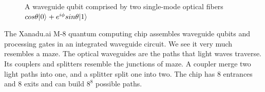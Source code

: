 \documentclass[oneside, letter, 12pt]{book}
\begin{document}
\begin{figure}[ht]\label{Fiber}
\caption{A waveguide qubit comprised by two single-mode optical fibers $cos{\theta} \vert {0} \rangle_{} + e^{i \phi} sin{\theta} \vert {1} \rangle_{}$}
\end{figure}

The Xanadu.ai M-8 quantum computing chip assembles waveguide qubits and processing gates in an integrated waveguide circuit. We see it very much resembles a maze. The optical waveguides are the paths that light waves traverse. Its couplers and splitters resemble the junctions of maze. A coupler merge two light paths into one, and a splitter split one into two. The chip has 8 entrances and 8 exits and can build $8^8$ possible paths.
\end{document}
